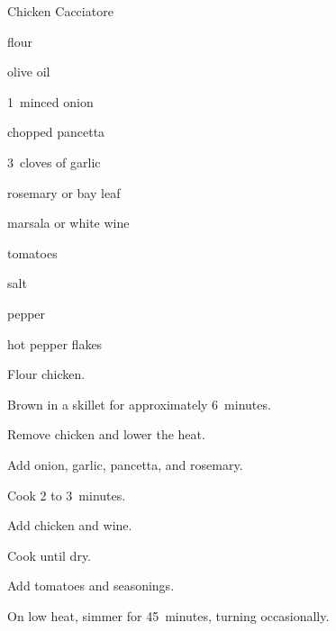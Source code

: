 \begin{recipe}{Chicken Cacciatore}{}{}

\begin{ingredients}
\item flour
\item \C{\quarter} olive oil
\item 1~minced onion
\item {} chopped pancetta
\item 3~cloves of garlic
\item {} rosemary or bay leaf
\item {} marsala or white wine
\item {} tomatoes
\item salt
\item pepper
\item hot pepper flakes
\end{ingredients}

\begin{directions}
\item Flour chicken.
\item Brown in a skillet for approximately 6~minutes.
\item Remove chicken and lower the heat.
\item Add onion, garlic, pancetta, and rosemary.
\item Cook 2 to 3~minutes.
\item Add chicken and wine.
\item Cook until dry.
\item Add tomatoes and seasonings.
\item On low heat, simmer for 45~minutes, turning occasionally.
\end{directions}

\end{recipe}
